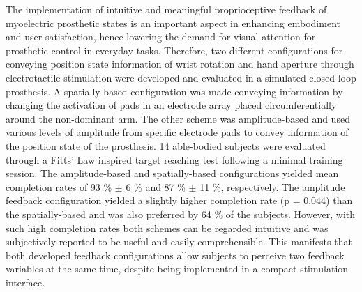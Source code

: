 The implementation of intuitive and meaningful proprioceptive feedback of myoelectric prosthetic states is an important aspect in enhancing embodiment and user satisfaction, hence lowering the demand for visual attention for prosthetic control in everyday tasks. Therefore, two different configurations for conveying position state information of wrist rotation and hand aperture through electrotactile stimulation were developed and evaluated in a simulated closed-loop prosthesis. A spatially-based configuration was made conveying information by changing the activation of pads in an electrode array placed circumferentially around the non-dominant arm. The other scheme was amplitude-based and used various levels of amplitude from specific electrode pads to convey information of the position state of the prosthesis. 14 able-bodied subjects were evaluated through a Fitts' Law inspired target reaching test following a minimal training session.
The amplitude-based and spatially-based configurations yielded mean completion rates of 93 \% $\boldsymbol{\pm}$ 6 \% and 87 \% $\boldsymbol{\pm}$ 11 \%, respectively. The amplitude feedback configuration yielded a slightly higher completion rate (p = 0.044) than the spatially-based and was also preferred by 64 \% of the subjects. However, with such high completion rates both schemes can be regarded intuitive and was subjectively reported to be useful and easily comprehensible. This manifests that both developed feedback configurations allow subjects to perceive two feedback variables at the same time, despite being implemented in a compact stimulation interface.